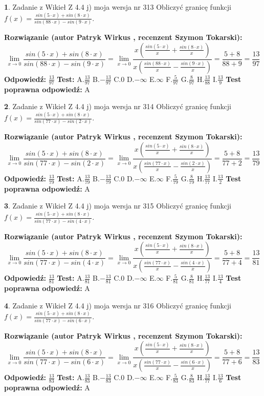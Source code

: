 \documentclass[12pt, a4paper]{article}
\theoremstyle{definition} %
\newtheorem{zad}{}
\newcommand{\zadStart}[1]{\begin{zad}#1\newline}
\newcommand{\zadStop}{\end{zad}}
\newcommand{\rozwStart}[2]{\noindent \textbf{Rozwiązanie (autor #1 , recenzent #2): }\newline}
\newcommand{\rozwStop}{\newline}
\newcommand{\odpStart}{\noindent \textbf{Odpowiedź:}\newline}
\newcommand{\odpStop}{\newline}
\newcommand{\testStart}{\noindent \textbf{Test:}\newline}
\newcommand{\testStop}{\newline}
\newcommand{\kluczStart}{\noindent \textbf{Test poprawna odpowiedź:}\newline}
\newcommand{\kluczStop}{\newline}
\begin{document}
\zadStart{Zadanie z Wikieł Z 4.4 j) moja wersja nr 313}
Obliczyć granicę funkcji $f(x)=\frac{sin(5\cdot x) +sin(8\cdot x)}{sin(88\cdot x) -sin(9\cdot x)}$.
\zadStop
\rozwStart{Patryk Wirkus}{Szymon Tokarski}
$$\lim\limits_{x\to 0}\frac{sin(5\cdot x) +sin(8\cdot x)}{sin(88\cdot x) -sin(9\cdot x)}=\lim\limits_{x\to 0}\frac{x(\frac{sin(5\cdot x)}{x}+\frac{sin(8\cdot x)}{x})}{x(\frac{sin(88\cdot x)}{x}-\frac{sin(9\cdot x)}{x})}=\frac{5+8}{88+9} = \frac{13}{97}$$
\rozwStop
\odpStart
$\frac{13}{97}$
\odpStop
\testStart
A.$\frac{13}{97}$
B.$-\frac{13}{97}$
C.$0$
D.$-\infty$
E.$\infty$
F.$\frac{5}{97}$
G.$\frac{8}{97}$
H.$\frac{13}{88}$
I.$\frac{13}{9}$
\testStop
\kluczStart
A
\kluczStop



\zadStart{Zadanie z Wikieł Z 4.4 j) moja wersja nr 314}
Obliczyć granicę funkcji $f(x)=\frac{sin(5\cdot x) +sin(8\cdot x)}{sin(77\cdot x) -sin(2\cdot x)}$.
\zadStop
\rozwStart{Patryk Wirkus}{Szymon Tokarski}
$$\lim\limits_{x\to 0}\frac{sin(5\cdot x) +sin(8\cdot x)}{sin(77\cdot x) -sin(2\cdot x)}=\lim\limits_{x\to 0}\frac{x(\frac{sin(5\cdot x)}{x}+\frac{sin(8\cdot x)}{x})}{x(\frac{sin(77\cdot x)}{x}-\frac{sin(2\cdot x)}{x})}=\frac{5+8}{77+2} = \frac{13}{79}$$
\rozwStop
\odpStart
$\frac{13}{79}$
\odpStop
\testStart
A.$\frac{13}{79}$
B.$-\frac{13}{79}$
C.$0$
D.$-\infty$
E.$\infty$
F.$\frac{5}{79}$
G.$\frac{8}{79}$
H.$\frac{13}{77}$
I.$\frac{13}{2}$
\testStop
\kluczStart
A
\kluczStop



\zadStart{Zadanie z Wikieł Z 4.4 j) moja wersja nr 315}
Obliczyć granicę funkcji $f(x)=\frac{sin(5\cdot x) +sin(8\cdot x)}{sin(77\cdot x) -sin(4\cdot x)}$.
\zadStop
\rozwStart{Patryk Wirkus}{Szymon Tokarski}
$$\lim\limits_{x\to 0}\frac{sin(5\cdot x) +sin(8\cdot x)}{sin(77\cdot x) -sin(4\cdot x)}=\lim\limits_{x\to 0}\frac{x(\frac{sin(5\cdot x)}{x}+\frac{sin(8\cdot x)}{x})}{x(\frac{sin(77\cdot x)}{x}-\frac{sin(4\cdot x)}{x})}=\frac{5+8}{77+4} = \frac{13}{81}$$
\rozwStop
\odpStart
$\frac{13}{81}$
\odpStop
\testStart
A.$\frac{13}{81}$
B.$-\frac{13}{81}$
C.$0$
D.$-\infty$
E.$\infty$
F.$\frac{5}{81}$
G.$\frac{8}{81}$
H.$\frac{13}{77}$
I.$\frac{13}{4}$
\testStop
\kluczStart
A
\kluczStop



\zadStart{Zadanie z Wikieł Z 4.4 j) moja wersja nr 316}
Obliczyć granicę funkcji $f(x)=\frac{sin(5\cdot x) +sin(8\cdot x)}{sin(77\cdot x) -sin(6\cdot x)}$.
\zadStop
\rozwStart{Patryk Wirkus}{Szymon Tokarski}
$$\lim\limits_{x\to 0}\frac{sin(5\cdot x) +sin(8\cdot x)}{sin(77\cdot x) -sin(6\cdot x)}=\lim\limits_{x\to 0}\frac{x(\frac{sin(5\cdot x)}{x}+\frac{sin(8\cdot x)}{x})}{x(\frac{sin(77\cdot x)}{x}-\frac{sin(6\cdot x)}{x})}=\frac{5+8}{77+6} = \frac{13}{83}$$
\rozwStop
\odpStart
$\frac{13}{83}$
\odpStop
\testStart
A.$\frac{13}{83}$
B.$-\frac{13}{83}$
C.$0$
D.$-\infty$
E.$\infty$
F.$\frac{5}{83}$
G.$\frac{8}{83}$
H.$\frac{13}{77}$
I.$\frac{13}{6}$
\testStop
\kluczStart
A
\kluczStop
\end{document}
